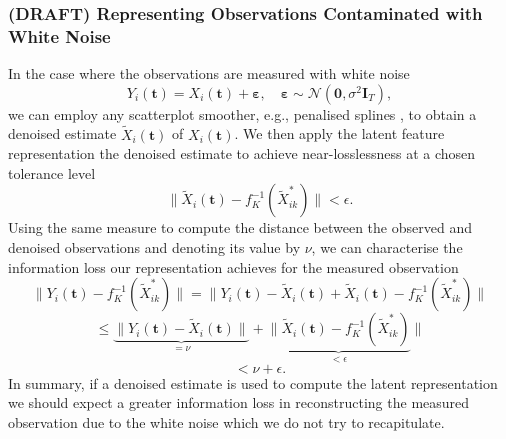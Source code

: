 \subsubsection{(DRAFT) Representing Observations Contaminated with White Noise}
In the case where the observations are measured with white noise
$$
Y_i(\mathbf{t}) = {X}_i(\mathbf{t}) + \boldsymbol{\varepsilon}, \quad \boldsymbol{\varepsilon} \sim \mathcal{N}(\mathbf{0}, \sigma^2 \mathbf{I}_{T}),
$$
we can employ any scatterplot smoother, e.g., penalised splines \parencite{osullivan_statistical_1986}, to obtain a denoised estimate $\widetilde{X}_i(\mathbf{t})$ of ${X}_i(\mathbf{t})$. 
We then apply the latent feature representation the denoised estimate to achieve near-losslessness at a chosen tolerance level
$$
\lVert \widetilde{X}_i(\mathbf{t}) - f^{-1}_{K}(\widetilde{X}_{ik}^*)\rVert < \epsilon.
$$
Using the same measure to compute the distance between the observed and denoised observations and denoting its value by $\nu$, we can characterise the information loss our representation achieves for the measured observation
$$
\lVert Y_i(\mathbf{t}) -  f^{-1}_{K}(\widetilde{X}_{ik}^*) \rVert = \lVert Y_i(\mathbf{t}) - \widetilde{X}_i(\mathbf{t}) + \widetilde{X}_i(\mathbf{t}) -  f^{-1}_{K}(\widetilde{X}_{ik}^*) \rVert
$$
$$
\leq
\underbrace{\lVert Y_i(\mathbf{t}) - \widetilde{X}_i(\mathbf{t}) \rVert}_{= \nu} + \underbrace{\lVert \widetilde{X}_i(\mathbf{t}) -  f^{-1}_{K}(\widetilde{X}_{ik}^*)}_{< \epsilon} \rVert
$$
$$
< \nu + \epsilon.
$$
In summary, if a denoised estimate is used to compute the latent representation we should expect a greater information loss in reconstructing the measured observation due to the white noise which we do not try to recapitulate.
